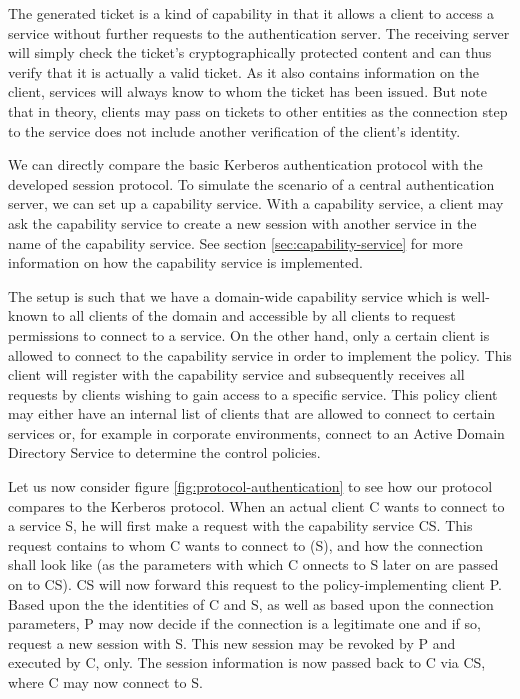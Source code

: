 The generated ticket is a kind of capability in that it allows a client to access a service without further requests to the authentication server.
The receiving server will simply check the ticket's cryptographically protected content and can thus verify that it is actually a valid ticket.
As it also contains information on the client, services will always know to whom the ticket has been issued.
But note that in theory, clients may pass on tickets to other entities as the connection step to the service does not include another verification of the client's identity.

We can directly compare the basic Kerberos authentication protocol with the developed session protocol.
To simulate the scenario of a central authentication server, we can set up a capability service.
With a capability service, a client may ask the capability service to create a new session with another service in the name of the capability service.
See section \ref{sec:capability-service} for more information on how the capability service is implemented.

The setup is such that we have a domain-wide capability service which is well-known to all clients of the domain and accessible by all clients to request permissions to connect to a service.
On the other hand, only a certain client is allowed to connect to the capability service in order to implement the policy.
This client will register with the capability service and subsequently receives all requests by clients wishing to gain access to a specific service.
This policy client may either have an internal list of clients that are allowed to connect to certain services or, for example in corporate environments, connect to an Active Domain Directory Service to determine the control policies.

Let us now consider figure \ref{fig:protocol-authentication} to see how our protocol compares to the Kerberos protocol.
When an actual client C wants to connect to a service S, he will first make a request with the capability service CS.
This request contains to whom C wants to connect to (S), and how the connection shall look like (as the parameters with which C onnects to S later on are passed on to CS).
CS will now forward this request to the policy-implementing client P.
Based upon the the identities of C and S, as well as based upon the connection parameters, P may now decide if the connection is a legitimate one and if so, request a new session with S.
This new session may be revoked by P and executed by C, only.
The session information is now passed back to C via CS, where C may now connect to S.

